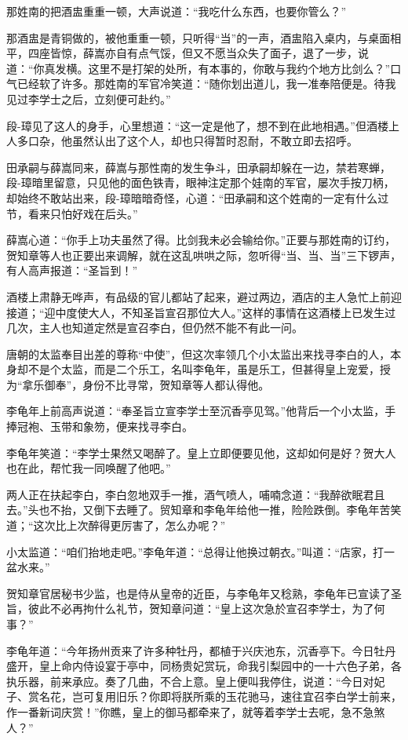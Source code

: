 \documentclass[12pt,oneside]{book}
\begin{document}
那姓南的把酒盅重重一顿，大声说道：``我吃什么东西，也要你管么？''

那酒盅是青铜做的，被他重重一顿，只听得``当''的一声，酒盅陷入桌内，与桌面相平，四座皆惊，薛嵩亦自有点气馁，但又不愿当众失了面子，退了一步，说道：``你真发横。这里不是打架的处所，有本事的，你敢与我约个地方比剑么？''口气已经软了许多。那姓南的军官冷笑道：``随你划出道儿，我一准奉陪便是。待我见过李学士之后，立刻便可赴约。''

段-璋见了这人的身手，心里想道：``这一定是他了，想不到在此地相遇。''但酒楼上人多口杂，他虽然认出了这个人，却也只得暂时忍耐，不敢立即去招呼。

田承嗣与薛嵩同来，薛嵩与那性南的发生争斗，田承嗣却躲在一边，禁若寒蝉，段-璋暗里留意，只见他的面色铁青，眼神注定那个娃南的军官，屡次手按刀柄，却始终不敢站出来，段-璋暗暗奇怪，心道：``田承嗣和这个姓南的一定有什么过节，看来只怕好戏在后头。''

薛嵩心道：``你手上功夫虽然了得。比剑我未必会输给你。''正要与那姓南的订约，贺知章等人也正要出来调解，就在这乱哄哄之际，忽听得``当、当、当''三下锣声，有人高声报道：``圣旨到！''

酒楼上肃静无哗声，有品级的官儿都站了起来，避过两边，酒店的主人急忙上前迎接道；``迎中度使大人，不知圣旨宣召那位大人。''这样的事情在这酒楼上已发生过几次，主人也知道定然是宣召李白，但仍然不能不有此一问。

唐朝的太监奉目出差的尊称``中使''，但这次率领几个小太监出来找寻李白的人，本身却不是个太监，而是二个乐工，名叫李龟年，虽是乐工，但甚得皇上宠爱，授为``拿乐御奉''，身份不比寻常，贺知章等人都认得他。

李龟年上前高声说道：``奉圣旨立宣李学士至沉香亭见驾。''他背后一个小太监，手捧冠袍、玉带和象笏，便来找寻李白。

李龟年笑道：``李学士果然又喝醉了。皇上立即便要见他，这却如何是好？贺大人也在此，帮忙我一同唤醒了他吧。''

两人正在扶起李白，李白忽地双手一推，酒气喷人，哺喃念道：``我醉欲眠君且去。''头也不抬，又倒下去睡了。贸知章和李龟年给他一推，险险跌倒。李龟年苦笑道；``这次比上次醉得更厉害了，怎么办呢？''

小太监道：``咱们抬地走吧。''李龟年道：``总得让他换过朝衣。''叫道：``店家，打一盆水来。''

贺知章官居秘书少监，也是侍从皇帝的近臣，与李龟年又稔熟，李龟年已宣读了圣旨，彼此不必再拘什么礼节，贺知章问道：``皇上这次急於宣召李学士，为了何事？''

李龟年道：``今年扬州贡来了许多种牡丹，都植于兴庆池东，沉香亭下。今日牡丹盛开，皇上命内侍设宴于亭中，同杨贵妃赏玩，命我引梨园中的一十六色子弟，各执乐器，前来承应。奏了几曲，不合上意。皇上便叫我停住，说道：``今日对妃子、赏名花，岂可复用旧乐？你即将朕所乘的玉花驰马，速往宜召李白学士前来，作一番新词庆赏！''你瞧，皇上的御马都牵来了，就等着李学士去呢，急不急煞人？''
\end{document}
